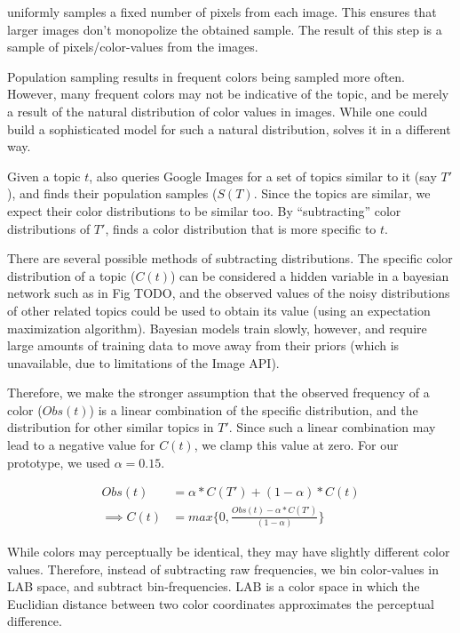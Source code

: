 \system uniformly samples a fixed number of pixels from each image. This ensures that larger images don't monopolize the obtained sample. The result of this step is a sample of pixels/color-values from the images.

Population sampling results in frequent colors being sampled more often. However, many frequent colors may not be indicative of the topic, and be merely a result of the natural distribution of color values in images. While one could build a sophisticated model for such a natural distribution, \system solves it in a different way.

Given a topic $t$, \system also queries Google Images for a set of topics similar to it (say $T'$), and finds their population samples ($S(T)$. Since the topics are similar, we expect their color distributions to be similar too. By ``subtracting'' color distributions of $T'$, \system finds a color distribution that is more specific to $t$. 

There are several possible methods of subtracting distributions. The specific color distribution of a topic ($C(t)$) can be considered a hidden variable in a bayesian network such as in Fig TODO, and the observed values of the noisy distributions of other related topics could be used to obtain its value (using an expectation maximization algorithm). Bayesian models train slowly, however, and require large amounts of training data to move away from their priors (which is unavailable, due to limitations of the Image API).

Therefore, we make the stronger assumption that the observed frequency of a color ($Obs(t)$) is a linear combination of the specific distribution, and the distribution for other similar topics in $T'$. Since such a linear combination may lead to a negative value for $C(t)$, we clamp this value at zero. For our prototype, we used $\alpha = 0.15$.

\begin{align}
\label{linear-color}
Obs(t) &= \alpha*C(T') + (1-\alpha)*C(t) \\
\implies  C(t) &= max\{0,\frac{Obs(t) - \alpha*C(T')}{(1-\alpha)}\}
\end{align}


While colors may perceptually be identical, they may have slightly different color values. Therefore, instead of subtracting raw frequencies, we bin color-values in LAB space, and subtract bin-frequencies. LAB is a color space in which the Euclidian distance between two color coordinates approximates the perceptual difference. 

